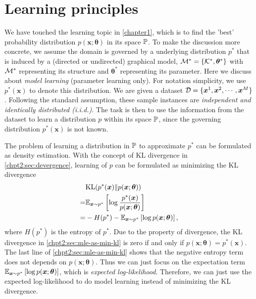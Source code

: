 \section{Learning principles}
\label{chpt2:sec:learning-principles}
We have touched the learning topic in \autoref{chapter1}, which is to find the 'best' probability distribution $p(\bm{x}; \bm{\theta})$ in its space $\mathbb{P}$. To make the discussion more concrete, we assume the domain is governed by a underlying distribution $p^{\ast}$ that is induced by a (directed or undirected) graphical model, $\mathcal{M}^{\ast} = \left\{ \mathcal{K}^{\ast}, \bm{\theta}^{\ast} \right\}$ with $\mathcal{M}^{\ast}$ representing its structure and $\bm{\theta}^{\ast}$ representing its parameter. Here we discuss about \textit{model learning} (parameter learning only). For notation simplicity, we use $p^{\ast}(\bm{x})$ to denote this distribution. We are given a dataset $\mathcal{D} = \{\bm{x}^{1}, \bm{x}^{2}, \cdots, \bm{x}^{M}\}$. Following the standard assumption, these sample instances are \textit{independent and identically distributed (i.i.d.)}. The task is then to use the information from the dataset to learn a distribution $p$ within its space $\mathbb{P}$, since the governing distribution $p^{\ast}(\bm{x})$ is not known.

The problem of learning a distribution in $\mathbb{P}$ to approximate $p^{\ast}$ can be formulated as density estimation. With the concept of KL divergence in \autoref{chpt2:sec:devergence}, learning of $p$ can be formulated as minimizing the KL divergence
\begin{align}\label{chpt2:sec:mle-as-min-kl}
  &\mathrm{KL}(p^{\ast}(\bm{x})\|p(\bm{x}; \bm{\theta})) \nonumber \\
  =& \mathbb{E}_{\bm{x} \sim p^{\ast}}\left[ \log{\frac{p^{\ast}(\bm{x})}{p(\bm{x}; \bm{\theta})}} \right] \nonumber \\
  =& - H(p^{\ast}) - \mathbb{E}_{\bm{x} \sim p^{\ast}}\left[ \log{{p(\bm{x}; \bm{\theta})}} \right],
\end{align}
where $H(p^{\ast})$ is the entropy of $p^{\ast}$.
Due to the property of divergence, the KL divergence in \ref{chpt2:sec:mle-as-min-kl} is zero if and only if $p(\bm{x};\bm{\theta})=p^{\ast}(\bm{x})$. The last line of \ref{chpt2:sec:mle-as-min-kl} shows that the negative entropy term does not depends on $p(\bm{x}; \bm{\theta})$. Thus we can just focus on the expectation term $\mathbb{E}_{\bm{x} \sim p^{\ast}}\left[ \log{{p(\bm{x}; \bm{\theta})}} \right]$, which is \textit{expected log-likelihood}. Therefore, we can just use the expected log-likelihood to do model learning instead of minimizing the KL divergence.

